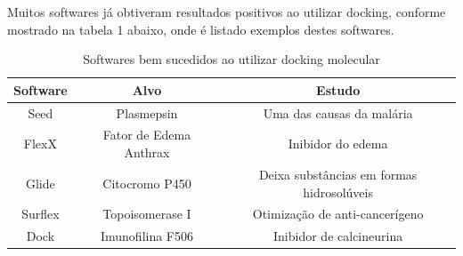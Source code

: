 \documentclass[tcc, capa]{texucpel}
\begin{document}
Muitos softwares já obtiveram resultados positivos ao utilizar docking, conforme mostrado na tabela 1 abaixo, onde é listado exemplos destes softwares.
% 
% 
% 

\begin{table}[h]
\centering
\caption{Softwares bem sucedidos ao utilizar docking molecular \cite{sliwoski2014computational} }

\begin{tabular}{@{}|c|c|c|@{}}
\toprule

Software & Alvo                   & Estudo                                                   \\ \midrule
Seed     & Plasmepsin             & Uma das causas da malária                                \\ \midrule
FlexX    & Fator de Edema Anthrax & Inibidor do edema                                        \\ \midrule
Glide    & Citocromo P450         & Deixa substâncias em formas hidrosolúveis         \\ \midrule
Surflex  & Topoisomerase I        & Otimização de anti-cancerígeno                           \\ \midrule
Dock     & Imunofilina F506       & Inibidor de calcineurina \\ \bottomrule
\end{tabular}
\end{table}
\end{document}
